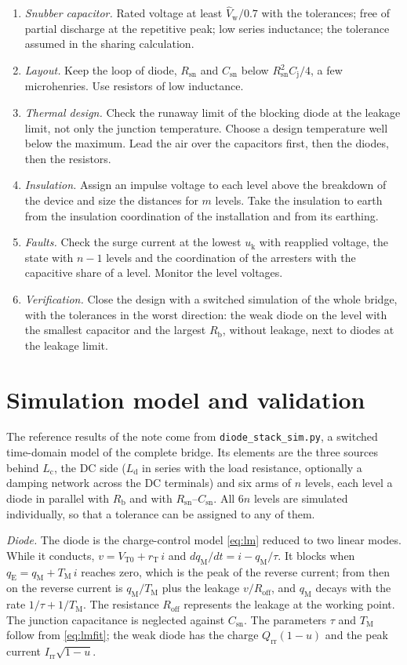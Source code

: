 \documentclass[10pt,a4paper]{scrartcl}
\newcommand{\Qrr}{Q_\mathrm{rr}}
\newcommand{\Irr}{I_\mathrm{rr}}
\newcommand{\Csn}{C_\mathrm{sn}}
\newcommand{\Rsn}{R_\mathrm{sn}}
\newcommand{\Rb}{R_\mathrm{b}}
\newcommand{\Lc}{L_\mathrm{c}}
\newcommand{\Ld}{L_\mathrm{d}}
\newcommand{\Vw}{\hat V_\mathrm{w}}
\newcommand{\TM}{T_\mathrm{M}}
\newcommand{\uk}{u_\mathrm{k}}
\begin{document}
\begin{enumerate}
\item \emph{Snubber capacitor.} Rated voltage at least $\Vw/0.7$ with the tolerances; free of partial discharge at the repetitive peak; low series inductance; the tolerance assumed in the sharing calculation.
\item \emph{Layout.} Keep the loop of diode, $\Rsn$ and $\Csn$ below $\Rsn^2 C_\mathrm{j}/4$, a few microhenries. Use resistors of low inductance.
\item \emph{Thermal design.} Check the runaway limit of the blocking diode at the leakage limit, not only the junction temperature. Choose a design temperature well below the maximum. Lead the air over the capacitors first, then the diodes, then the resistors.
\item \emph{Insulation.} Assign an impulse voltage to each level above the breakdown of the device and size the distances for $m$ levels. Take the insulation to earth from the insulation coordination of the installation and from its earthing.
\item \emph{Faults.} Check the surge current at the lowest $\uk$ with reapplied voltage, the state with $n - 1$ levels and the coordination of the arresters with the capacitive share of a level. Monitor the level voltages.
\item \emph{Verification.} Close the design with a switched simulation of the whole bridge, with the tolerances in the worst direction: the weak diode on the level with the smallest capacitor and the largest $\Rb$, without leakage, next to diodes at the leakage limit.
\end{enumerate}

\appendix
\section{Simulation model and validation}
\label{app:sim}
The reference results of the note come from \texttt{diode\_stack\_sim.py}, a switched time-domain model of the complete bridge. Its elements are the three sources behind $\Lc$, the DC side ($\Ld$ in series with the load resistance, optionally a damping network across the DC terminals) and six arms of $n$ levels, each level a diode in parallel with $\Rb$ and with $\Rsn$--$\Csn$. All $6n$ levels are simulated individually, so that a tolerance can be assigned to any of them.

\emph{Diode.} The diode is the charge-control model \eqref{eq:lm} reduced to two linear modes. While it conducts, $v = V_\mathrm{T0} + r_\mathrm{T}\,i$ and $dq_\mathrm{M}/dt = i - q_\mathrm{M}/\tau$. It blocks when $q_\mathrm{E} = q_\mathrm{M} + \TM\,i$ reaches zero, which is the peak of the reverse current; from then on the reverse current is $q_\mathrm{M}/\TM$ plus the leakage $v/R_\mathrm{off}$, and $q_\mathrm{M}$ decays with the rate $1/\tau + 1/\TM$. The resistance $R_\mathrm{off}$ represents the leakage at the working point. The junction capacitance is neglected against $\Csn$. The parameters $\tau$ and $\TM$ follow from \eqref{eq:lmfit}; the weak diode has the charge $\Qrr(1-u)$ and the peak current $\Irr\sqrt{1-u}$.
\end{document}
